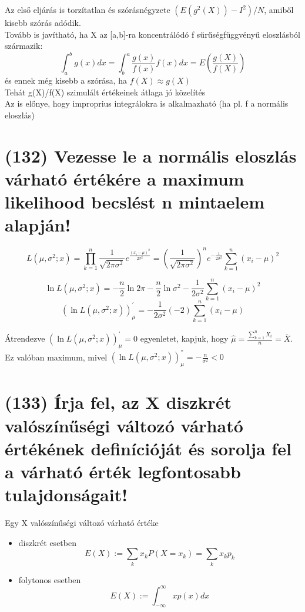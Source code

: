 \documentclass[12p]{article}
\begin{document}
Az első eljárás is torzítatlan és szórásnégyzete $(E(g^2(X)) - I^2) / N$, amiből kisebb szórás adódik.\\
Tovább is javítható, ha X az [a,b]-ra koncentrálódó f sűrűségfüggvényű eloszlásból származik:
$$\int^b_a g(x)dx = \int^a_b \frac{g(x)}{f(x)} f(x)dx = E (\frac{g(X)}{f(X)})$$
és ennek még kisebb a szórása, ha $f(X) \approx g(X)$\\
Tehát g(X)/f(X) szimulált értékeinek átlaga jó közelítés\\
Az is előnye, hogy improprius integrálokra is alkalmazható (ha pl. f a normális eloszlás)

\section{(132) Vezesse le a normális eloszlás várható értékére a maximum likelihood becslést n mintaelem alapján!}

$$L(\mu, \sigma^2;x) 
= \prod^n_{k=1} \frac{1}{\sqrt{2\pi \sigma^2}} 
e^{\frac{(x_i-\mu)^2}{2\sigma^2}}
=\left(\frac{1}{\sqrt{2\pi \sigma^2}}\right)^n 
e^{-\frac{1}{2 \sigma^2}} \sum^n_{k=1} (x_i - \mu )^2$$

$$\ln L(\mu, \sigma^2;x) = - \frac{n}{2} \ln 2\pi - \frac{n}{2} \ln \sigma^2 - \frac{1}{2\sigma^2} \sum^n_{k=1} (x_i - \mu)^2$$
$$(\ln L(\mu,\sigma^2;x))^{'}_{\mu} = - \frac{1}{2\sigma^2}(-2)\sum^n_{k=1}(x_i - \mu)$$

Átrendezve $(\ln L(\mu,\sigma^2;x))^{'}_{\mu} = 0$ egyenletet, kapjuk, hogy $\displaystyle{\hat{\mu} = \frac{\sum^n_{k=1} X_i}{n} = \overline{X}}$. Ez valóban maximum, mivel $(\ln L(\mu,\sigma^2;x))^{''}_{\mu} = -\frac{n}{\sigma^2} < 0$

\section{(133) Írja fel, az X diszkrét valószínűségi változó várható értékének definícióját és sorolja fel
a várható érték legfontosabb tulajdonságait!}

Egy X valószínűségi változó várható értéke

\begin{itemize}
	\item diszkrét esetben
		$$E(X) := \sum_k x_k P(X = x_k) = \sum_k x_k p_k$$
		
	\item folytonos esetben
		$$E(X) := \int_{-\infty}^\infty xp(x)dx$$
\end{itemize}
\end{document}
